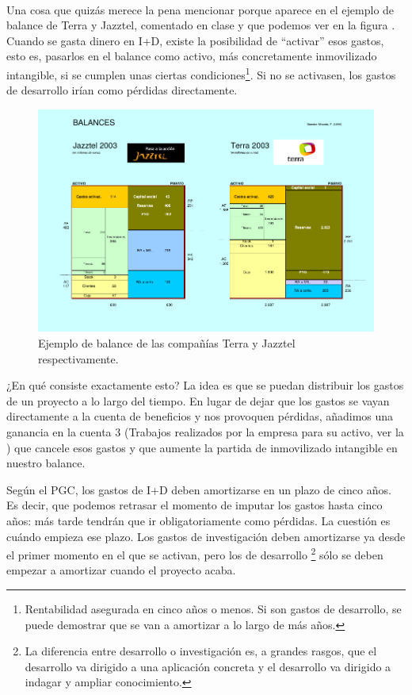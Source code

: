 \documentclass[nochap,palatino,shortheader]{apuntes}
\newcommand{\study}[1]{#1} \newcommand{\substudy}[1]{#1}
\begin{document}
\paragraph{} Una cosa que quizás merece la pena mencionar porque aparece en el ejemplo de balance de Terra y Jazztel, comentado en clase y que podemos ver en la figura . Cuando se gasta \substudy{dinero en I+D}, existe la posibilidad de ``\study{activar}'' esos gastos, esto es, \substudy{pasarlos en el balance como activo}, más concretamente \substudy{inmovilizado intangible}, si se cumplen unas ciertas condiciones\footnote{Rentabilidad asegurada en cinco años o menos. Si son gastos de desarrollo, se puede demostrar que se van a amortizar a lo largo de más años.}. \substudy{Si no} se activasen, los gastos de desarrollo \substudy{irían como pérdidas} directamente.

\begin{figure}[hbtp]
\centering
\includegraphics[width=\textwidth]{img/TerraJazztel.png}
\caption{Ejemplo de balance de las compañías Terra y Jazztel respectivamente.}
\label{fig:TerraJazztel}
\end{figure}

¿En qué consiste exactamente esto? La \study{idea} es que se puedan \study{distribuir los gastos} de un proyecto \study{a lo largo del tiempo}.
En lugar de dejar que los gastos se vayan directamente a la cuenta de beneficios y nos provoquen pérdidas, añadimos una ganancia en la cuenta 3 (Trabajos realizados por la empresa para su activo, ver la ) que cancele esos gastos y que aumente la partida de inmovilizado intangible en nuestro balance.

Según el PGC, los \substudy{gastos de I+D deben amortizarse en un plazo de cinco años}. Es decir, que podemos retrasar el momento de imputar los gastos hasta cinco años: más tarde tendrán que ir obligatoriamente como pérdidas. 
La cuestión es cuándo empieza ese plazo. 
Los gastos de investigación deben amortizarse ya desde el primer momento en el que se activan, pero los de \substudy{desarrollo}
\footnote{La diferencia entre desarrollo o investigación es, a grandes rasgos, que el \substudy{desarrollo} va dirigido a una \substudy{aplicación concreta} y el \substudy{desarrollo} va dirigido a \substudy{indagar y ampliar conocimiento}.} 
sólo se deben empezar a \substudy{amortizar cuando el proyecto acaba}.
\end{document}
